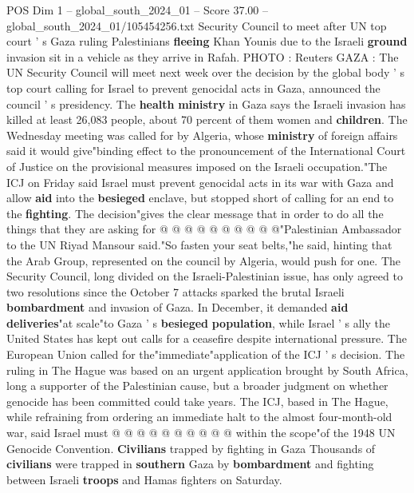 \begin{textsample}{POS Dim 1 – global\_south\_2024\_01 – Score 37.00 – global\_south\_2024\_01/105454256.txt}  \label{ex:f1_pos_113}
Security Council to meet after UN top court ' s Gaza ruling Palestinians \textbf{fleeing} Khan Younis due to the Israeli \textbf{ground} invasion sit in a vehicle as they arrive in Rafah.
PHOTO : Reuters GAZA : The UN Security Council will meet next week over the decision by the global body ' s top court calling for Israel to prevent genocidal acts in Gaza, announced the council ' s presidency.
The \textbf{health} \textbf{ministry} in Gaza says the Israeli invasion has killed at least 26,083 people, about 70 percent of them women and \textbf{children}.
The Wednesday meeting was called for by Algeria, whose \textbf{ministry} of foreign affairs said it would give"binding effect to the pronouncement of the International Court of Justice on the provisional measures imposed on the Israeli occupation."The ICJ on Friday said Israel must prevent genocidal acts in its war with Gaza and allow \textbf{aid} into the \textbf{besieged} enclave, but stopped short of calling for an end to the \textbf{fighting}.
The decision"gives the clear message that in order to do all the things that they are asking for @ @ @ @ @ @ @ @ @ @"Palestinian Ambassador to the UN Riyad Mansour said."So fasten your seat belts,"he said, hinting that the Arab Group, represented on the council by Algeria, would push for one.
The Security Council, long divided on the Israeli-Palestinian issue, has only agreed to two resolutions since the October 7 attacks sparked the brutal Israeli \textbf{bombardment} and invasion of Gaza.
In December, it demanded \textbf{aid} \textbf{deliveries}"at scale"to Gaza ' s \textbf{besieged} \textbf{population}, while Israel ' s ally the United States has kept out calls for a ceasefire despite international pressure.
The European Union called for the"immediate"application of the ICJ ' s decision.
The ruling in The Hague was based on an urgent application brought by South Africa, long a supporter of the Palestinian cause, but a broader judgment on whether genocide has been committed could take years.
The ICJ, based in The Hague, while refraining from ordering an immediate halt to the almost four-month-old war, said Israel must @ @ @ @ @ @ @ @ @ @ within the scope"of the 1948 UN Genocide Convention. \textbf{Civilians} trapped by fighting in Gaza Thousands of \textbf{civilians} were trapped in \textbf{southern} Gaza by \textbf{bombardment} and fighting between Israeli \textbf{troops} and Hamas fighters on Saturday.

\end{textsample}
